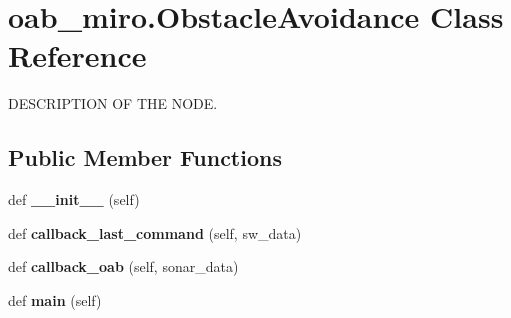 \hypertarget{classoab__miro_1_1ObstacleAvoidance}{}\section{oab\+\_\+miro.\+Obstacle\+Avoidance Class Reference}
\label{classoab__miro_1_1ObstacleAvoidance}


D\+E\+S\+C\+R\+I\+P\+T\+I\+ON OF T\+HE N\+O\+DE.  


\subsection*{Public Member Functions}
\begin{DoxyCompactItemize}
\item 
\mbox{\label{classoab__miro_1_1ObstacleAvoidance_a4c09f48116e03a2ada68ee1babd82a9e}} 
def {\bfseries \+\_\+\+\_\+init\+\_\+\+\_\+} (self)
\item 
\mbox{\label{classoab__miro_1_1ObstacleAvoidance_a1fa593e0b629518b392e37b64025a468}} 
def {\bfseries callback\+\_\+last\+\_\+command} (self, sw\+\_\+data)
\item 
\mbox{\label{classoab__miro_1_1ObstacleAvoidance_a292e590575d7e28589a60b9c83776fb6}} 
def {\bfseries callback\+\_\+oab} (self, sonar\+\_\+data)
\item 
\mbox{\label{classoab__miro_1_1ObstacleAvoidance_a36b64da5042fa20d2ddb98778c798aae}} 
def {\bfseries main} (self)
\end{DoxyCompactItemize}
